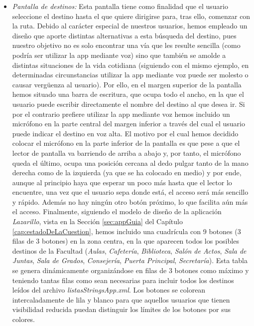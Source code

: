 \begin{itemize}
	\item \textit{Pantalla de destinos:} Esta pantalla tiene como finalidad que el usuario seleccione el destino hasta el que quiere dirigirse para, tras ello, comenzar con la ruta. Debido al carácter especial de nuestros usuarios, hemos empleado un diseño que aporte distintas alternativas a esta búsqueda del destino, pues nuestro objetivo no es solo encontrar una vía que les resulte sencilla (como podría ser utilizar la app mediante voz) sino que también se amolde a distintas situaciones de la vida cotidiana (siguiendo con el mismo ejemplo, en determinadas circunstancias utilizar la app mediante voz puede ser molesto o causar vergüenza al usuario). Por ello, en el margen superior de la pantalla hemos situado una barra de escritura, que ocupa todo el ancho, en la que el usuario puede escribir directamente el nombre del destino al que desea ir. Si por el contrario prefiere utilizar la app mediante voz hemos incluido un micrófono en la parte central del margen inferior a través del cual el usuario puede indicar el destino en voz alta. El motivo por el cual hemos decidido colocar el micrófono en la parte inferior de la pantalla es que pese a que el lector de pantalla va barriendo de arriba a abajo y, por tanto, el micrófono queda el último, ocupa una posición cercana al dedo pulgar tanto de la mano derecha como de la izquierda (ya que se ha colocado en medio) y por ende, aunque al principio haya que esperar un poco más hasta que el lector lo encuentre, una vez que el usuario sepa donde está, el acceso será más sencillo y rápido. Además no hay ningún otro botón próximo, lo que facilita aún más el acceso. Finalmente, siguiendo el modelo de diseño de la aplicación \textit{Lazarillo}, vista en la Sección \ref{sec:appGuia} del Capítulo \ref{cap:estadoDeLaCuestion}, hemos incluido una cuadrícula con 9 botones (3 filas de 3 botones) en la zona centra, en la que aparecen todos los posibles destinos de la Facultad (\textit{Aulas}, \textit{Cafetería}, \textit{Biblioteca}, \textit{Salón de Actos}, \textit{Sala de Juntas}, \textit{Sala de Grados}, \textit{Consejería},\textit{ Puerta Principal}, \textit{Secretaría}). Esta tabla se genera dinámicamente organizándose en filas de 3 botones como máximo y teniendo tantas filas como sean necesarias para incluir todos los destinos leídos del archivo \textit{listasStringsApp.xml}. Los botones se colorean intercaladamente de lila y blanco para que aquellos usuarios que tienen visibilidad reducida puedan distinguir los límites de los botones por sus colores. 
	

\end{itemize}
